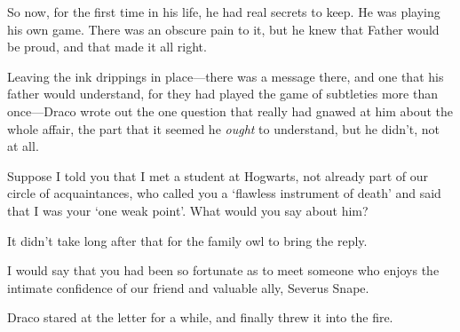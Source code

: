 So now, for the first time in his life, he had real secrets to keep. He was playing his own game. There was an obscure pain to it, but he knew that Father would be proud, and that made it all right.

Leaving the ink drippings in place—there was a message there, and one that his father would understand, for they had played the game of subtleties more than once—Draco wrote out the one question that really had gnawed at him about the whole affair, the part that it seemed he \emph{ought} to understand, but he didn’t, not at all.

\begin{writtenNote}

Suppose I told you that I met a student at Hogwarts, not already part of our circle of acquaintances, who called you a ‘flawless instrument of death’ and said that I was your ‘one weak point’. What would you say about him?

\end{writtenNote}

It didn’t take long after that for the family owl to bring the reply.

\begin{writtenNote}

I would say that you had been so fortunate as to meet someone who enjoys the intimate confidence of our friend and valuable ally, Severus Snape.

\end{writtenNote}

Draco stared at the letter for a while, and finally threw it into the fire.

